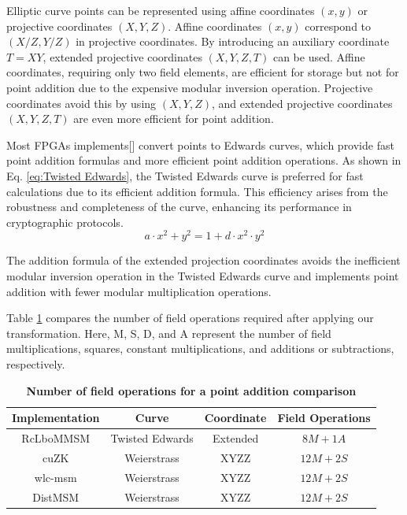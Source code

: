 \documentclass[conference]{IEEEtran}
\begin{document}
Elliptic curve points can be represented using affine coordinates $(x, y)$ or projective coordinates $(X, Y, Z)$. Affine coordinates $(x, y)$ correspond to $(X / Z, Y / Z)$ in projective coordinates. By introducing an auxiliary coordinate $T = XY$, extended projective coordinates $(X, Y, Z, T)$ can be used. Affine coordinates, requiring only two field elements, are efficient for storage but not for point addition due to the expensive modular inversion operation. Projective coordinates avoid this by using $(X, Y, Z)$, and extended projective coordinates $(X, Y, Z, T)$ are even more efficient for point addition.

Most FPGAs implements[] convert points to Edwards curves, which provide fast point addition formulas and more efficient point addition operations. As shown in Eq. \ref{eq:Twisted Edwards}, the Twisted Edwards curve is preferred for fast calculations due to its efficient addition formula. This efficiency arises from the robustness and completeness of the curve, enhancing its performance in cryptographic protocols.
\begin{equation}
a \cdot x^2+y^2=1+d \cdot x^2 \cdot y^2
\label{eq:Twisted Edwards}
\end{equation}

The addition formula of the extended projection coordinates avoids the inefficient modular inversion operation in the Twisted Edwards curve and implements point addition with fewer modular multiplication operations.

Table \ref{tab:field-operations} compares the number of field operations required after applying our transformation. Here, M, S, D, and A represent the number of field multiplications, squares, constant multiplications, and additions or subtractions, respectively.

\begin{table}[htbp]
    \caption{\textbf{Number of field operations for a point addition comparison}}
    \begin{center}
    \begin{tabular}{|c|c|c|c|}
    \hline
    \textbf{Implementation} & \textbf{Curve} & \textbf{Coordinate} & \textbf{Field Operations} \\
    \hline
    RcLboMMSM & Twisted Edwards & Extended & $8M + 1A$ \\
    \hline
    cuZK & Weierstrass & XYZZ & $12M + 2S$ \\
    \hline
    wlc-msm & Weierstrass & XYZZ & $12M + 2S$ \\
    \hline
    DistMSM & Weierstrass & XYZZ & $12M + 2S$ \\
    \hline
    \end{tabular}
    \label{tab:field-operations}
    \end{center}
\end{table}
\end{document}
